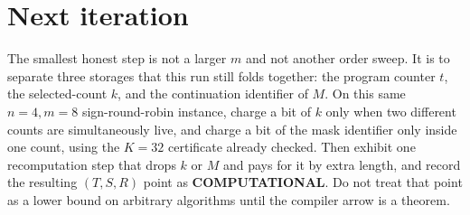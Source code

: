 \documentclass[11pt]{article}
\begin{document}
\section{Next iteration}
The smallest honest step is not a larger \(m\) and not another order sweep.
It is to separate three storages that this run still folds together: the program counter \(t\), the selected-count \(k\), and the continuation identifier of \(M\).
On this same \(n=4,m=8\) sign-round-robin instance, charge a bit of \(k\) only when two different counts are simultaneously live, and charge a bit of the mask identifier only inside one count, using the \(K=32\) certificate already checked.
Then exhibit one recomputation step that drops \(k\) or \(M\) and pays for it by extra length, and record the resulting \((T,S,R)\) point as \textbf{COMPUTATIONAL}.
Do not treat that point as a lower bound on arbitrary algorithms until the compiler arrow is a theorem.

\end{document}
